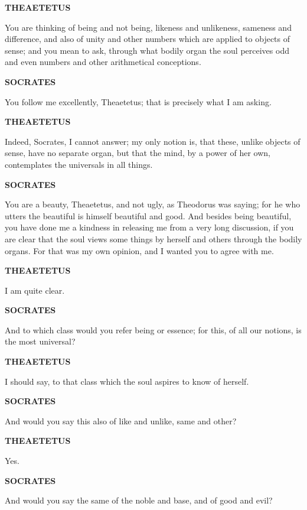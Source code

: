 \documentclass[11pt,letter]{article}
\begin{document}
\par \textbf{THEAETETUS}
\par   You are thinking of being and not being, likeness and unlikeness, sameness and difference, and also of unity and other numbers which are applied to objects of sense; and you mean to ask, through what bodily organ the soul perceives odd and even numbers and other arithmetical conceptions.

\par \textbf{SOCRATES}
\par   You follow me excellently, Theaetetus; that is precisely what I am asking.

\par \textbf{THEAETETUS}
\par   Indeed, Socrates, I cannot answer; my only notion is, that these, unlike objects of sense, have no separate organ, but that the mind, by a power of her own, contemplates the universals in all things.

\par \textbf{SOCRATES}
\par   You are a beauty, Theaetetus, and not ugly, as Theodorus was saying; for he who utters the beautiful is himself beautiful and good. And besides being beautiful, you have done me a kindness in releasing me from a very long discussion, if you are clear that the soul views some things by herself and others through the bodily organs. For that was my own opinion, and I wanted you to agree with me.

\par \textbf{THEAETETUS}
\par   I am quite clear.

\par \textbf{SOCRATES}
\par   And to which class would you refer being or essence; for this, of all our notions, is the most universal?

\par \textbf{THEAETETUS}
\par   I should say, to that class which the soul aspires to know of herself.

\par \textbf{SOCRATES}
\par   And would you say this also of like and unlike, same and other?

\par \textbf{THEAETETUS}
\par   Yes.

\par \textbf{SOCRATES}
\par   And would you say the same of the noble and base, and of good and evil?
\end{document}
